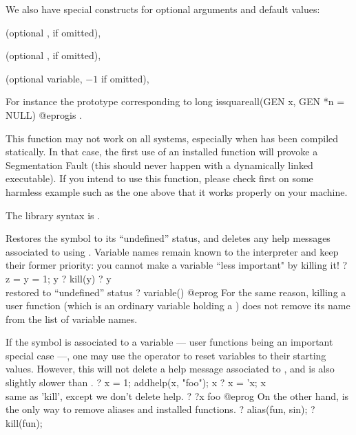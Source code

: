  \noindent We also have special constructs for optional arguments and default
 values:

 \item {} (optional ,  if omitted),

 \item {} (optional ,  if omitted),

 \item {} (optional variable, $-1$ if omitted),

For instance the prototype corresponding to
\bprog
  long issquareall(GEN x, GEN *n = NULL)
@eprog\noindent is .

 This function may not work on all systems, especially
when  has been compiled statically. In that case, the first use of an
installed function will provoke a Segmentation Fault (this should never
happen with a dynamically linked executable). If you intend to use this
function, please check first on some harmless example such as the one above
that it works properly on your machine.

The library syntax is .

\label{se:kill}
Restores the symbol  to its ``undefined'' status, and deletes any
help messages associated to  using . Variable names
remain known to the interpreter and keep their former priority: you cannot
make a variable ``less important" by killing it!
\bprog
? z = y = 1; y
? kill(y)
? y            \\ restored to ``undefined'' status
? variable()
@eprog\noindent
For the same reason, killing a user function (which is an ordinary
variable holding a ) does not remove its name from the list of
variable names.

If the symbol is associated to a variable --- user functions being an
important special case ---, one may use the  operator
 to reset variables to their starting values. However, this
will not delete a help message associated to , and is also slightly
slower than .
\bprog
? x = 1; addhelp(x, "foo"); x
? x = 'x; x   \\ same as 'kill', except we don't delete help.
? ?x
foo
@eprog\noindent
On the other hand,  is the only way to remove aliases and installed
functions.
\bprog
? alias(fun, sin);
? kill(fun);

